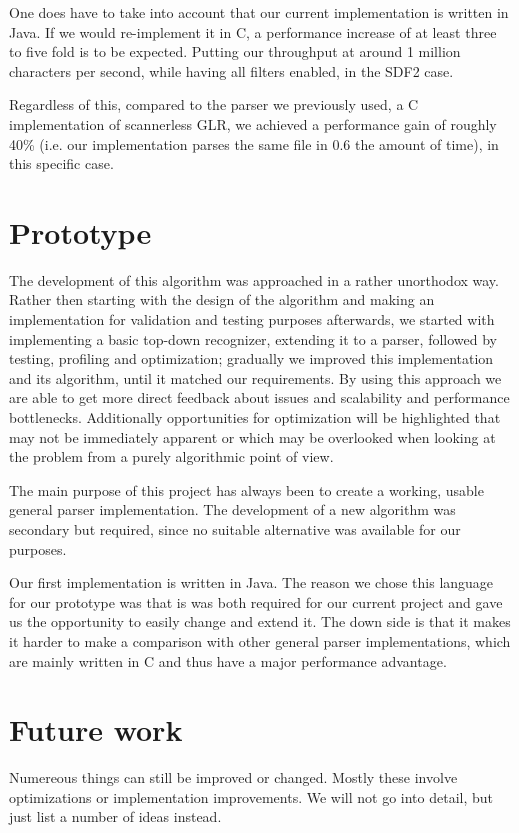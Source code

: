 \documentclass[a4paper,10pt]{article}
\begin{document}
One does have to take into account that our current implementation is written in Java. If we would re-implement it in C, a performance increase of at least three to five fold is to be expected. Putting our throughput at around 1 million characters per second, while having all filters enabled, in the SDF2 case.

Regardless of this, compared to the parser we previously used, a C implementation of scannerless GLR, we achieved a performance gain of roughly 40\% (i.e. our implementation parses the same file in 0.6 the amount of time), in this specific case.

\section{Prototype}

The development of this algorithm was approached in a rather unorthodox way. Rather then starting with the design of the algorithm and making an implementation for validation and testing purposes afterwards, we started with implementing a basic top-down recognizer, extending it to a parser, followed by testing, profiling and optimization; gradually we improved this implementation and its algorithm, until it matched our requirements. By using this approach we are able to get more direct feedback about issues and scalability and performance bottlenecks. Additionally opportunities for optimization will be highlighted that may not be immediately apparent or which may be overlooked when looking at the problem from a purely algorithmic point of view.

The main purpose of this project has always been to create a working, usable general parser implementation. The development of a new algorithm was secondary but required, since no suitable alternative was available for our purposes.

Our first implementation is written in Java. The reason we chose this language for our prototype was that is was both required for our current project and gave us the opportunity to easily change and extend it. The down side is that it makes it harder to make a comparison with other general parser implementations, which are mainly written in C and thus have a major performance advantage.

\pagebreak
\section{Future work}

Numereous things can still be improved or changed. Mostly these involve optimizations or implementation improvements. We will not go into detail, but just list a number of ideas instead.
\end{document}
